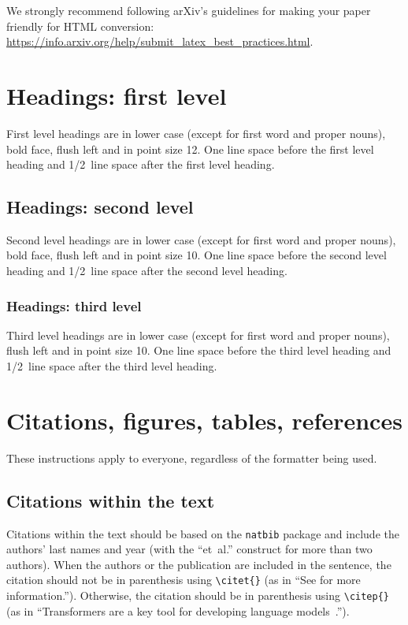\documentclass{article} %
\begin{document}
We strongly recommend following arXiv's guidelines for making your paper friendly for HTML conversion: \url{https://info.arxiv.org/help/submit_latex_best_practices.html}.


\section{Headings: first level}
\label{headings}

First level headings are in lower case (except for first word and proper nouns), bold face,
flush left and in point size 12. One line space before the first level
heading and 1/2~line space after the first level heading.

\subsection{Headings: second level}

Second level headings are in lower case (except for first word and proper nouns), bold face,
flush left and in point size 10. One line space before the second level
heading and 1/2~line space after the second level heading.

\subsubsection{Headings: third level}

Third level headings are in lower case (except for first word and proper nouns),
flush left and in point size 10. One line space before the third level
heading and 1/2~line space after the third level heading.

\section{Citations, figures, tables, references}\label{others}

These instructions apply to everyone, regardless of the formatter being used.

\subsection{Citations within the text}

Citations within the text should be based on the \texttt{natbib} package
and include the authors' last names and year (with the ``et~al.'' construct
for more than two authors). When the authors or the publication are
included in the sentence, the citation should not be in parenthesis using \verb|\citet{}| (as
in ``See \citet{Vaswani+2017} for more information.''). Otherwise, the citation
should be in parenthesis using \verb|\citep{}| (as in ``Transformers are a key tool
for developing language models~\citep{Vaswani+2017}.'').
\end{document}
